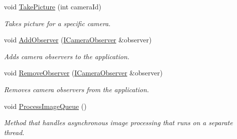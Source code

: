 \begin{DoxyCompactItemize}
void \hyperlink{classWebApp_a967d783a9f1be56fef662eee01b6e93a}{Take\+Picture} (int camera\+Id)
\begin{DoxyCompactList}\small\item\em Takes picture for a specific camera. \end{DoxyCompactList}\item 
\mbox{\label{classWebApp_a6ab15a70631109dc33d48e97da3eb050}} 
void \hyperlink{classWebApp_a6ab15a70631109dc33d48e97da3eb050}{Add\+Observer} (\hyperlink{classICameraObserver}{I\+Camera\+Observer} \&observer)
\begin{DoxyCompactList}\small\item\em Adds camera observers to the application. \end{DoxyCompactList}\item 
\mbox{\label{classWebApp_aa6c0e00182011fa15f0bd8fcbaf415a1}} 
void \hyperlink{classWebApp_aa6c0e00182011fa15f0bd8fcbaf415a1}{Remove\+Observer} (\hyperlink{classICameraObserver}{I\+Camera\+Observer} \&observer)
\begin{DoxyCompactList}\small\item\em Removes camera observers from the application. \end{DoxyCompactList}\item 
\mbox{\label{classWebApp_a96282cfecb4a378e9d9ce6fff3b8e746}} 
void \hyperlink{classWebApp_a96282cfecb4a378e9d9ce6fff3b8e746}{Process\+Image\+Queue} ()
\begin{DoxyCompactList}\small\item\em Method that handles asynchronous image processing that runs on a separate thread. \end{DoxyCompactList}\end{DoxyCompactItemize}
